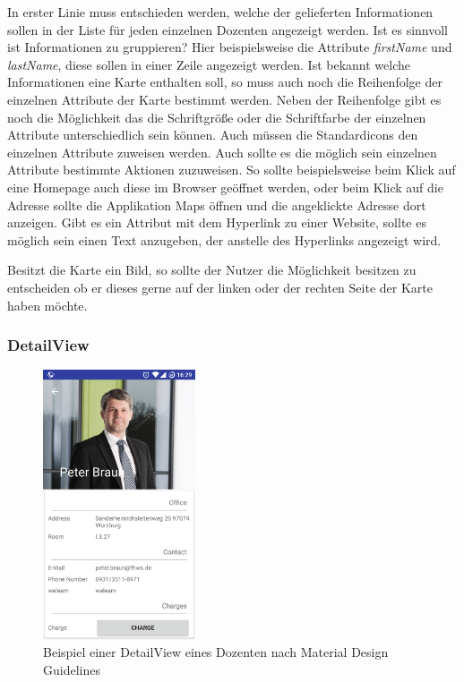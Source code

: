 In erster Linie muss entschieden werden, welche der gelieferten Informationen sollen in der Liste für jeden einzelnen Dozenten angezeigt werden. Ist es sinnvoll ist Informationen zu gruppieren? Hier beispielsweise die Attribute \textit{firstName} und \textit{lastName}, diese sollen in einer Zeile angezeigt werden. Ist bekannt welche Informationen eine Karte enthalten soll, so muss auch noch die Reihenfolge der einzelnen Attribute der Karte bestimmt werden.
Neben der Reihenfolge gibt es noch die Möglichkeit das die Schriftgröße oder die Schriftfarbe der einzelnen Attribute unterschiedlich sein können. Auch müssen die Standardicons den einzelnen Attribute zuweisen werden. Auch sollte es die möglich sein einzelnen Attribute bestimmte Aktionen zuzuweisen. So sollte beispielsweise beim Klick auf eine Homepage auch diese im Browser geöffnet werden, oder beim Klick auf die Adresse sollte die Applikation Maps öffnen und die angeklickte Adresse dort anzeigen. Gibt es ein Attribut mit dem Hyperlink zu einer Website, sollte es möglich sein einen Text anzugeben, der anstelle des Hyperlinks angezeigt wird. 

Besitzt die Karte ein Bild, so sollte der Nutzer die Möglichkeit besitzen zu entscheiden ob er dieses gerne auf der linken oder der rechten Seite der Karte haben möchte.

\subsubsection{DetailView}

\begin{figure}[H]
	\begin{center}
		\includegraphics[width=0.4\textwidth]{images/detail.png}
		\caption{Beispiel einer DetailView eines Dozenten nach Material Design Guidelines}
		\label{fig:detail}
	\end{center}
\end{figure}

